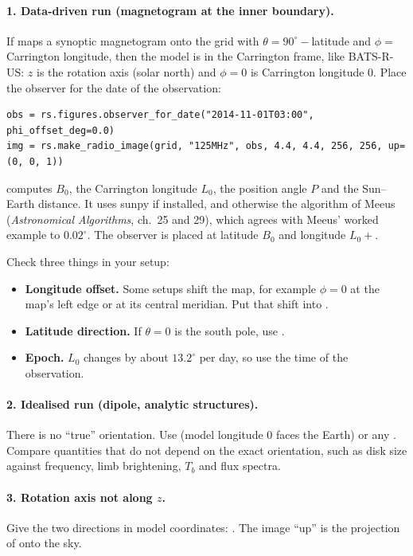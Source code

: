 \paragraph{1. Data-driven run (magnetogram at the inner boundary).}
If  maps a synoptic magnetogram onto the grid with
$\theta=90^\circ-$latitude and $\phi=$ Carrington longitude, then the model is in the
Carrington frame, like BATS-R-US: $z$ is the rotation axis (solar north) and $\phi=0$ is
Carrington longitude 0. Place the observer for the date of the observation:
\begin{lstlisting}[style=pyex]
obs = rs.figures.observer_for_date("2014-11-01T03:00", phi_offset_deg=0.0)
img = rs.make_radio_image(grid, "125MHz", obs, 4.4, 4.4, 256, 256, up=(0, 0, 1))
\end{lstlisting}
 computes $B_0$, the Carrington longitude $L_0$, the
position angle $P$ and the Sun--Earth distance. It uses sunpy if installed, and otherwise
the algorithm of Meeus (\emph{Astronomical Algorithms}, ch.~25 and 29), which agrees with
Meeus' worked example to $0.02^\circ$. The observer is placed at latitude $B_0$ and
longitude $L_0+$.

Check three things in your setup:
\begin{itemize}[itemsep=1pt]
\item \textbf{Longitude offset.} Some setups shift the map, for example $\phi=0$ at the
      map's left edge or at its central meridian. Put that shift into
      .
\item \textbf{Latitude direction.} If $\theta=0$ is the south pole, use .
\item \textbf{Epoch.} $L_0$ changes by about $13.2^\circ$ per day, so use the time of the
      observation.
\end{itemize}

\paragraph{2. Idealised run (dipole, analytic structures).}
There is no ``true'' orientation. Use  (model longitude 0
faces the Earth) or any . Compare quantities that do not
depend on the exact orientation, such as disk size against frequency, limb brightening,
$T_b$ and flux spectra.

\paragraph{3. Rotation axis not along $z$.}
Give the two directions in model coordinates:
. The image ``up''
is the projection of  onto the sky.

